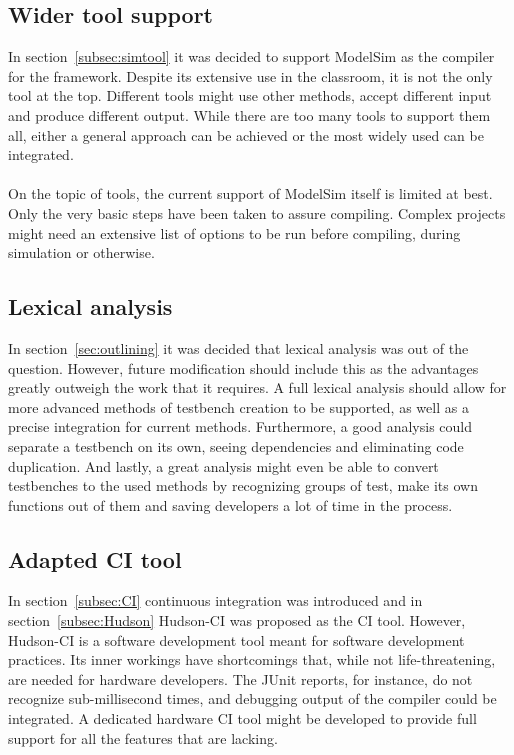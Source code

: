 \documentclass[11pt,british]{article}
\begin{document}
\subsection{Wider tool support}
In section~\ref{subsec:simtool} it was decided to support ModelSim as the compiler for the framework. Despite its extensive use in the classroom, it is not the only tool at the top. Different tools might use other methods, accept different input and produce different output. While there are too many tools to support them all, either a general approach can be achieved or the most widely used can be integrated.
\\
\\
On the topic of tools, the current support of ModelSim itself is limited at best. Only the very basic steps have been taken to assure compiling. Complex projects might need an extensive list of options to be run before compiling, during simulation or otherwise.

\subsection{Lexical analysis}
In section~\ref{sec:outlining} it was decided that lexical analysis was out of the question. However, future modification should include this as the advantages greatly outweigh the work that it requires. A full lexical analysis should allow for more advanced methods of testbench creation to be supported, as well as a precise integration for current methods. Furthermore, a good analysis could separate a testbench on its own, seeing dependencies and eliminating code duplication. And lastly, a great analysis might even be able to convert testbenches to the used methods by recognizing groups of test, make its own functions out of them and saving developers a lot of time in the process.

\subsection{Adapted CI tool}
In section~\ref{subsec:CI} continuous integration was introduced and in section~\ref{subsec:Hudson} Hudson-CI was proposed as the \gls{CI} tool. However, Hudson-CI is a software development tool meant for software development practices. Its inner workings have shortcomings that, while not life-threatening, are needed for hardware developers. The JUnit reports, for instance, do not recognize sub-millisecond times, and debugging output of the compiler could be integrated. A dedicated hardware CI tool might be developed to provide full support for all the features that are lacking.
\end{document}
